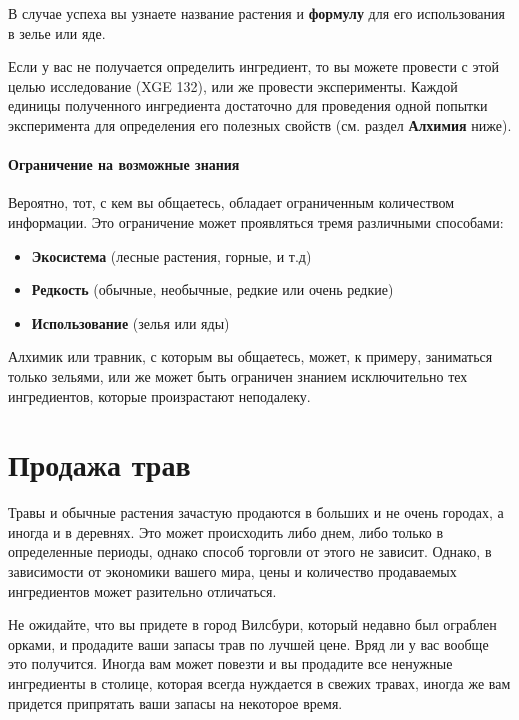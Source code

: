 \documentclass[a4paper, 9pt, twocolumn]{book}
\begin{document}
	В случае успеха вы узнаете название растения и \textbf{формулу} для его использования в зелье или яде.
	
	
	Если у вас не получается определить ингредиент, то вы можете провести с этой целью исследование (XGE 132), или же провести эксперименты. Каждой единицы полученного ингредиента достаточно для проведения одной попытки эксперимента для определения его полезных свойств (см. раздел \textbf{Алхимия} ниже).
	
	\paragraph*{Ограничение на возможные знания}
	
	Вероятно, тот, с кем вы общаетесь, обладает ограниченным количеством информации. Это ограничение может проявляться тремя различными способами:
	
	\begin{itemize}
		\item \textbf{Экосистема} (лесные растения, горные, и т.д)
		
		\item \textbf{Редкость} (обычные, необычные, редкие или очень редкие)
		
		\item \textbf{Использование} (зелья или яды)
	\end{itemize}

	Алхимик или травник, с которым вы общаетесь, может, к примеру, заниматься только зельями, или же может быть ограничен знанием исключительно тех ингредиентов, которые произрастают неподалеку.	
	
	\section{Продажа трав}
	
	Травы и обычные растения зачастую продаются в больших и не очень городах, а иногда и в деревнях. Это может происходить либо днем, либо только в определенные периоды, однако способ торговли от этого не зависит. Однако, в зависимости от экономики вашего мира, цены и количество продаваемых ингредиентов может разительно отличаться.
	
	Не ожидайте, что вы придете в город Вилсбури, который недавно был ограблен орками, и продадите ваши запасы трав по лучшей цене. Вряд ли у вас вообще это получится. Иногда вам может повезти и вы продадите все ненужные ингредиенты в столице, которая всегда нуждается в свежих травах, иногда же вам придется припрятать ваши запасы на некоторое время.
	
\end{document}

